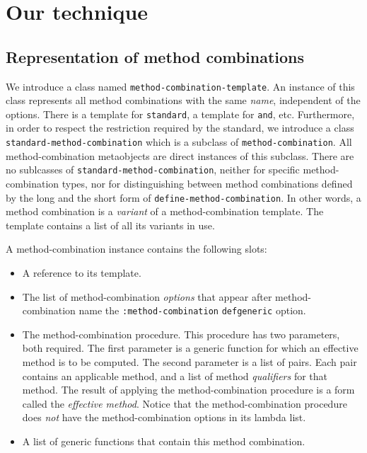 \section{Our technique}

\subsection{Representation of method combinations}

We introduce a class named \texttt{method-combination-template}.  An
instance of this class represents all method combinations with the
same \emph{name}, independent of the options.  There is a template for
\texttt{standard}, a template for \texttt{and}, etc.  Furthermore, in
order to respect the restriction required by the standard, we
introduce a class \texttt{standard-method-combination} which is a
subclass of \texttt{method-combination}.  All method-combination
metaobjects are direct instances of this subclass.  There are no
sublcasses of \texttt{standard-method-combination}, neither for
specific method-combination types, nor for distinguishing between
method combinations defined by the long and the short form of
\texttt{define-method-combination}.  In other words, a method
combination is a \emph{variant} of a method-combination template.  The
template contains a list of all its variants in use.

A method-combination instance contains the following slots:

\begin{itemize}
\item A reference to its template.
\item The list of method-combination \emph{options} that appear after
  method-combination name the \texttt{:method-combination}
  \texttt{defgeneric} option.
\item The method-combination procedure.  This procedure has two
  parameters, both required.  The first parameter is a generic
  function for which an effective method is to be computed.  The
  second parameter is a list of pairs.  Each pair contains an
  applicable method, and a list of method \emph{qualifiers} for that
  method.  The result of applying the method-combination procedure is
  a form called the \emph{effective method}.  Notice that the
  method-combination procedure does \emph{not} have the
  method-combination options in its lambda list.
\item A list of generic functions that contain this method combination.
\end{itemize}

